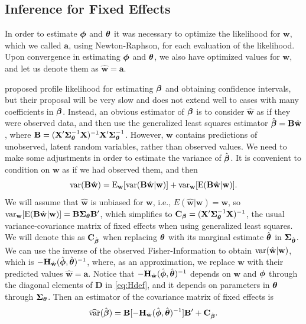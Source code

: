\documentclass[12pt, titlepage]{article}
\begin{document}

\subsection{Inference for Fixed Effects}

In order to estimate $\boldsymbol{\phi}$ and $\boldsymbol{\theta}$ it was necessary to optimize the likelihood for $\mathbf{w}$, which we called $\mathbf{a}$, using Newton-Raphson, for each evaluation of the likelihood.  Upon convergence in estimating $\boldsymbol{\phi}$ and $\boldsymbol{\theta}$, we also have optimized values for $\mathbf{w}$, and let us denote them as $\hat{\mathbf{w}} = \mathbf{a}$.  

\citet{ bonat_practical_2016} proposed profile likelihood for estimating $\boldsymbol{\beta}$ and obtaining confidence intervals, but their proposal will be very slow and does not extend well to cases with many coefficients in $\boldsymbol{\beta}$. Instead, an obvious estimator of $\boldsymbol{\beta}$ is to consider $\hat{\mathbf{w}}$ as if they were observed data, and then use the generalized least squares estimator $\hat{\boldsymbol{\beta}} = \mathbf{B}\hat{\mathbf{w}}$, where $\mathbf{B} = (\mathbf{X}^{\prime}\mbox{\boldmath $\Sigma$}_{\boldsymbol{\theta}}^{-1}\mathbf{X})^{-1}\mathbf{X}^{\prime}\mbox{\boldmath $\Sigma$}_{\boldsymbol{\theta}}^{-1}$.  However, $\mathbf{w}$ contains predictions of unobserved, latent random variables, rather than observed values.  We need to make some adjustments in order to estimate the variance of $\hat{\boldsymbol{\beta}}$.  It is convenient to condition on $\mathbf{w}$ as if we had observed them, and then
$$
\textrm{var}(\mathbf{B}\hat{\mathbf{w}}) = \textrm{E}_{\mathbf{w}}[\textrm{var}(\mathbf{B}\hat{\mathbf{w}}|\mathbf{w})] + \textrm{var}_{\mathbf{w}}[\textrm{E}(\mathbf{B}\hat{\mathbf{w}}|\mathbf{w})].
$$
We will assume that $\hat{\mathbf{w}}$ is unbiased for $\mathbf{w}$, i.e., $E(\hat{\mathbf{w}}|\mathbf{w}) = \mathbf{w}$, so $\textrm{var}_{\mathbf{w}}[\textrm{E}(\mathbf{B}\hat{\mathbf{w}}|\mathbf{w})] = \mathbf{B}\mbox{\boldmath $\Sigma$}_{\boldsymbol{\theta}}\mathbf{B}^{\prime}$, which simplifies to $\mathbf{C}_{\boldsymbol{\beta}} = (\mathbf{X}^{\prime}\mbox{\boldmath $\Sigma$}_{\boldsymbol{\theta}}^{-1}\mathbf{X})^{-1}$, the usual variance-covariance matrix of fixed effects when using generalized least squares. We will denote this as $\mathbf{C}_{\hat{\boldsymbol{\beta}}}$ when replacing $\boldsymbol{\theta}$ with its marginal estimate $\hat{\boldsymbol{\theta}}$ in $\mbox{\boldmath $\Sigma$}_{\hat{\boldsymbol{\theta}}}$. We can use the inverse of the observed Fisher-Information to obtain $\textrm{var}(\hat{\mathbf{w}}|\mathbf{w})$, which is $-\mathbf{H}_{\hat{\mathbf{w}}}(\hat{\boldsymbol{\phi}},\hat{\boldsymbol{\theta}})^{-1}$, where, as an approximation, we replace $\mathbf{w}$ with their predicted values $\hat{\mathbf{w}} = \mathbf{a}$. Notice that $-\mathbf{H}_{\hat{\mathbf{w}}}(\hat{\boldsymbol{\phi}},\hat{\boldsymbol{\theta}})^{-1}$ depends on $\mathbf{w}$ and $\boldsymbol{\phi}$ through the diagonal elements of $\mathbf{D}$ in \eqref{eq:Hdef}, and it depends on parameters in $\boldsymbol{\theta}$ through $\mbox{\boldmath $\Sigma$}_{\boldsymbol{\theta}}$.  Then an estimator of the covariance matrix of fixed effects is
\begin{equation} \label{eq:sglmm_varfe}
\widehat{\textrm{var}}(\hat{\boldsymbol{\beta}}) = \mathbf{B}[-\mathbf{H}_{\hat{\mathbf{w}}}(\hat{\boldsymbol{\phi}},\hat{\boldsymbol{\theta}})^{-1}]\mathbf{B}^{\prime} + \mathbf{C}_{\hat{\boldsymbol{\beta}}}.
\end{equation}
\end{document}
